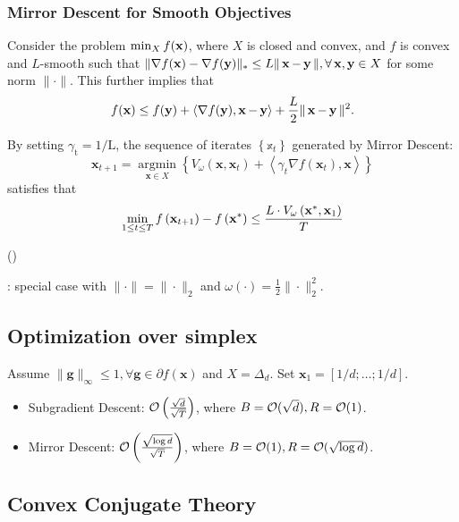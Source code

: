 \subsubsection*{Mirror Descent for Smooth Objectives}
Consider the problem $\min _{X} f(\x)$, where $X$ is closed and convex, and $f$ is convex and $L$-smooth such that $\|\nabla f(\x)-\nabla f(\y)\|_{*} \leq L\|\x-\y\|, \forall \x, \y \in X$ for some norm $\|\cdot\|$. This further implies that
$$
f(\x) \leq f(\y)+\langle\nabla f(\y), \x-\y\rangle+\frac{L}{2}\|\x-\y\|^{2} .
$$

By setting $\gamma_{\mathrm{t}}=1 / \mathrm{L}$, the sequence of iterates $\left\{\mathbb{x}_{{t}}\right\}$ generated by Mirror Descent:
$$
\mathbf{x}_{{t}+1}=\underset{\mathbf{x} \in {X}}{\operatorname{argmin}}\left\{{V}_{\omega}\left(\mathbf{x}, \mathbf{x}_{{t}}\right)+\left\langle\gamma_{{t}} \nabla f\left(\mathbf{x}_{{t}}\right), \mathbf{x}\right\rangle\right\}
$$
satisfies that
$$
\min _{1 \leq t \leq T} f\left(\x_{t+1}\right)-f\left(\x^{*}\right) \leq \frac{L \cdot V_{\omega}\left(\x^{*}, \x_{1}\right)}{T}
$$


()

: special case with $\|\cdot\|=\|\cdot\|_{2}$ and $\omega(\cdot)=\frac{1}{2}\|\cdot\|_{2}^{2}$.






\subsection*{Optimization over simplex}
Assume $\|\mathbf{g}\|_{\infty} \leq 1, \forall \mathbf{g} \in \partial f(\mathbf{x})$ and $X=\Delta_{d}$. Set $\mathbf{x}_{1}=[1 / d ; \ldots ; 1 / d]$.
\begin{itemize}[leftmargin=*]
    \item Subgradient Descent: $\O\left(\frac{\sqrt{d}}{\sqrt{T}}\right)$, where $B=\O(\sqrt{d}), R=\O(1)$.
    \item Mirror Descent: $\O\left(\frac{\sqrt{\log d}}{\sqrt{T}}\right)$, where $B=\O(1), R=\O(\sqrt{\log d})$.
\end{itemize}








\subsection*{Convex Conjugate Theory}
